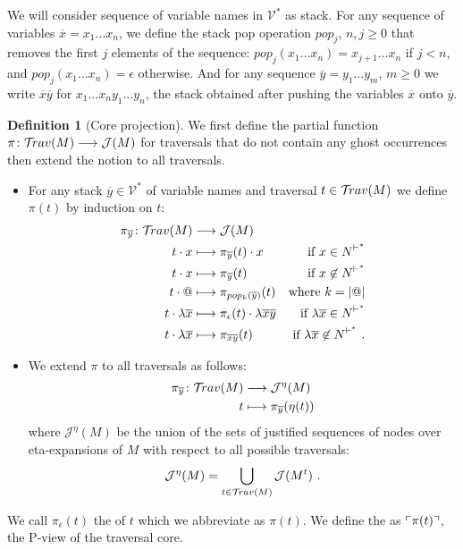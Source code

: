 \documentclass{article}
\theoremstyle{definition}
\newtheorem{definition}{Definition}[section]
\newcommand\Nodes{N}%
\newcommand{\travulc}{\travset}
\def\coresymbol{\pi} %
\newcommand{\core}[1]{\coresymbol(#1)} %
\newcommand{\enables}{\vdash} %
\newcommand{\NodeHjByRoot}{\Nodes^{\enables^*}} %
\def\justseqset{\mathcal{J}}
\begin{document}
We will consider sequence of variable names in $\mathcal{V}^*$ as stack.
For any sequence of variables $\overline{x} = x_1 \ldots x_n$, we define the stack pop operation $pop_j$, $n,j\geq0$ that removes the first $j$ elements of the sequence: $pop_j (x_1 \ldots x_n) = x_{j+1} \ldots x_n$ if $j<n$, and $pop_j (x_1 \ldots x_n) = \epsilon$ otherwise. And for any sequence $\overline{y} = y_1 \ldots y_m$, $m\geq0$ we write $\overline{x}\overline{y}$ for
$x_1 \ldots x_n y_1 \ldots y_n$, the stack obtained after pushing the variables $\overline{x}$ onto $\overline{y}$.

\begin{definition}[Core projection]
  \label{def:coreprojection}
We first define the partial function $\coresymbol \colon \travulc(M) \longrightarrow \justseqset(M)$ for traversals that do not contain any ghost occurrences then extend the notion to all traversals.
\begin{itemize}
\item For any stack $\overline{y} \in \mathcal{V}^*$ of variable names and traversal $t\in\travulc(M)$ we define $\coresymbol (t)$ by induction on $t$:
\begin{align*}
\coresymbol_{\overline{y}} \colon \travulc(M) & \longrightarrow \justseqset(M) \\
 t\cdot x &\longmapsto \coresymbol_{\overline{y}}(t) \cdot x & \mbox{if } x\in \NodeHjByRoot \\
 t\cdot x &\longmapsto \coresymbol_{\overline{y}}(t) & \mbox{if } x\not\in\NodeHjByRoot \\
 t\cdot @ &\longmapsto \coresymbol_{pop_k({\overline{y}})}(t) & \mbox{where $k = |@|$} \\
 t\cdot \lambda \overline{x} & \longmapsto \coresymbol_{\epsilon}(t) \cdot \lambda \overline{x}\overline{y} & \mbox{if } \lambda \overline{x}\in \NodeHjByRoot \\
 t\cdot \lambda \overline{x} & \longmapsto \coresymbol_{\overline{x} \overline{y}}(t) & \mbox{if } \lambda \overline{x}\not\in \NodeHjByRoot \ .
\end{align*}

\item We extend $\coresymbol$ to all traversals as follows:
\begin{align*}
\coresymbol_{\overline{y}} \colon \travulc(M) & \longrightarrow \justseqset^\eta(M) \\
 t &\longmapsto \coresymbol_{\overline{y}}(\eta(t))
\end{align*}
where $\justseqset^\eta(M)$ be the union of the sets of justified sequences of nodes over eta-expansions of $M$ with respect to all possible traversals:
$$\justseqset^\eta(M) = \Union_{t\in\travulc(M)} \justseqset(M^t) \ .$$
\end{itemize}

We call $\coresymbol_\epsilon(t)$ the  of $t$ which we abbreviate as $\core{t}$.
We define the  as $\pview{\core{t}}$, the P-view of the traversal core.

\end{definition}
\end{document}
